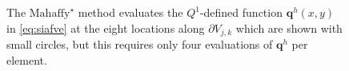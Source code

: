 \documentclass[11pt]{amsart}
\newcommand\bq{\mathbf{q}}
\newcommand{\Mstar}{$\text{Mahaffy}^\star$\xspace}
\begin{document}
\begin{figure}[ht]
\begin{center}

\end{center}
\caption{The \Mstar method evaluates the $Q^1$-defined function $\bq^h(x,y)$ in \eqref{eq:siafve} at the eight locations along $\partial V_{j,k}$ which are shown with small circles, but this requires only four evaluations of $\bq^h$ per element.}
\label{fig:mahaffystar}
\end{figure}






\begin{comment}
Here is what the MPAS Land-Ice User's Manual version 3.0 says:

\begin{quote}
\small
Velocities and fluxes are calculated on the midpoint of Voronoi cell edges.  The normal component of surface slope is calculated on cell edges using surface elevation at adjacent cell centers.  The tangential component of surface slope is calculated on cell edges using surface elevation at adjacent vertices. The surface elevation at vertices is calculated from the values at adjacent cell centers using barycentric interpolation. Ice thickness on edges is calculated as the average of the adjacent cell center values (2nd-order approximation).
\end{quote}

Looking at this, and the code, I don't think they think of it as Petrov-Galerkin
\end{comment}
\end{document}
